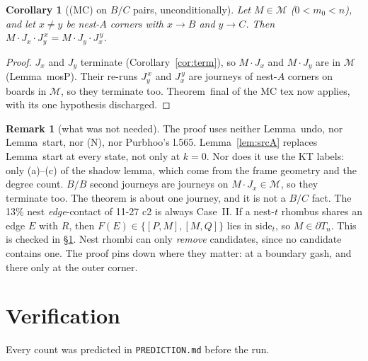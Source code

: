 \documentclass[11pt]{article}
\newtheorem{corollary}[theorem]{Corollary}
\theoremstyle{definition}\newtheorem{definition}[theorem]{Definition}\newtheorem{remark}[theorem]{Remark}
\newcommand{\M}{\mathcal M}
\begin{document}
\begin{corollary}[(MC) on $B/C$ pairs, unconditionally]\label{cor:mc}
Let $M\in\M$ ($0<m_0<n$), and let $x\ne y$ be nest-$A$ corners with $x\to B$ and $y\to C$. Then $M\cdot J_x\cdot J_y^{\,x}=M\cdot J_y\cdot J_x^{\,y}$.
\end{corollary}
\begin{proof}
$J_x$ and $J_y$ terminate (Corollary~\ref{cor:term}), so $M\cdot J_x$ and $M\cdot J_y$ are in $\M$ (Lemma~mosP). Their re-runs $J_y^{\,x}$ and $J_x^{\,y}$ are journeys of nest-$A$ corners on boards in $\M$, so they terminate too. Theorem~final of the MC tex now applies, with its one hypothesis discharged.
\end{proof}

\begin{remark}[what was not needed]
The proof uses neither Lemma~undo, nor Lemma~start, nor (N), nor Purbhoo's l.565. Lemma~\ref{lem:srcA} replaces Lemma~start at every state, not only at $k=0$. Nor does it use the KT labels: only (a)--(c) of the shadow lemma, which come from the frame geometry and the degree count. $B/B$ second journeys are journeys on $M\cdot J_x\in\M$, so they terminate too. The theorem is about one journey, and it is not a $B/C$ fact.
The 13\% nest \emph{edge}-contact of 11-27 c2 is always Case~II. If a nest-$t$ rhombus shares an edge $E$ with $R$, then $F(E)\in\{[P,M],[M,Q]\}$ lies in $\mathrm{side}_t$, so $M\in\partial T_n$. This is checked in \S\ref{sec:ver}. Nest rhombi can only \emph{remove} candidates, since no candidate contains one. The proof pins down where they matter: at a boundary gash, and there only at the outer corner.
\end{remark}

\section{Verification}\label{sec:ver}
Every count was predicted in \texttt{PREDICTION.md} before the run.
\end{document}
